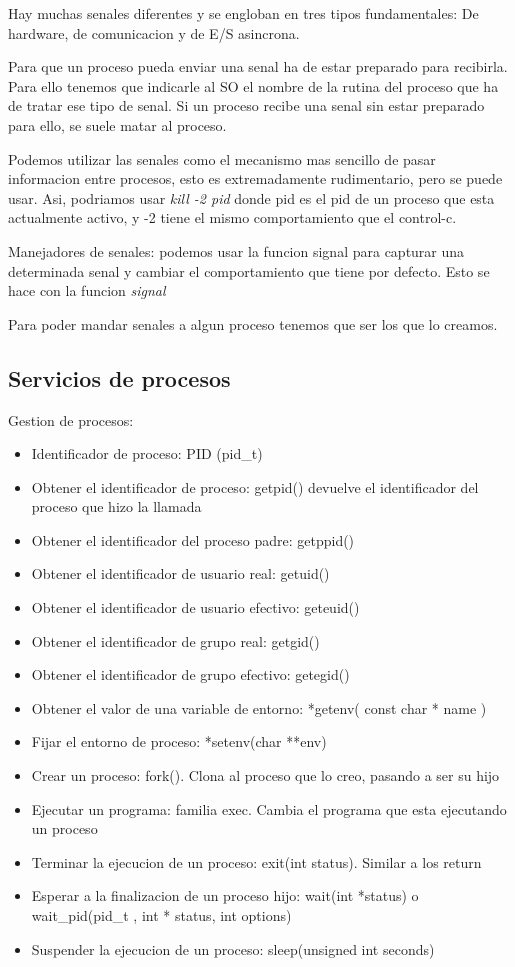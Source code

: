 \documentclass[12pt, letterpaper]{article}
\begin{document}
Hay muchas senales diferentes y se engloban en tres tipos fundamentales: De hardware, de comunicacion y de E/S asincrona.\par

Para que un proceso pueda enviar una senal ha de estar preparado para recibirla. Para ello tenemos que indicarle al SO el nombre de la rutina del proceso que ha de tratar ese tipo de senal. Si un proceso recibe una senal sin estar preparado para ello, se suele matar al proceso.

Podemos utilizar las senales como el mecanismo mas sencillo de pasar informacion entre procesos, esto es extremadamente rudimentario, pero se puede usar. Asi, podriamos usar \textit{kill -2 pid} donde pid es el pid de un proceso que esta actualmente activo, y -2 tiene el mismo comportamiento que el control-c. \par

Manejadores de senales: podemos usar la funcion signal para capturar una determinada senal y cambiar el comportamiento que tiene por defecto. Esto se hace con la funcion \textit{signal} \par

Para poder mandar senales a algun proceso tenemos que ser los que lo creamos.

\subsection{Servicios de procesos}

Gestion de procesos:

\begin{itemize}
	\item{Identificador de proceso: PID (pid\_t)}
	\item{Obtener el identificador de proceso: getpid() devuelve el identificador del proceso que hizo la llamada}
	\item{Obtener el identificador del proceso padre: getppid()}
	\item{Obtener el identificador de usuario real: getuid()}
	\item{Obtener el identificador de usuario efectivo: geteuid()}
	\item{Obtener el identificador de grupo real: getgid()}
	\item{Obtener el identificador de grupo efectivo: getegid()}
	\item{Obtener el valor de una variable de entorno: *getenv( const char * name )}
	\item{Fijar el entorno de proceso: *setenv(char **env)}
	\item{Crear un proceso: fork(). Clona al proceso que lo creo, pasando a ser su hijo}
	\item{Ejecutar un programa: familia exec. Cambia el programa que esta ejecutando un proceso}
	\item{Terminar la ejecucion de un proceso: exit(int status). Similar a los return}
	\item{Esperar a la finalizacion de un proceso hijo: wait(int *status) o wait\_pid(pid\_t , int * status, int options)}
	\item{Suspender la ejecucion de un proceso: sleep(unsigned int seconds)}
\end{itemize}
\end{document}
